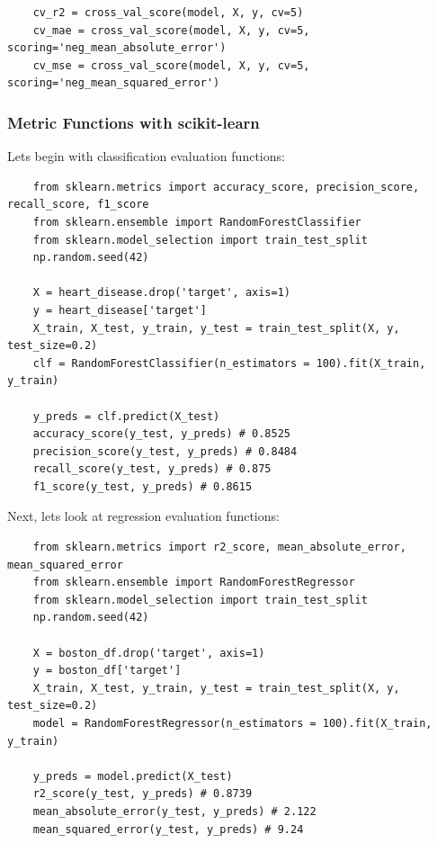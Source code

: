 \documentclass[11pt, a4paper]{article}
\begin{document}
\begin{spacing}{1.1}
\begin{lstlisting}
	cv_r2 = cross_val_score(model, X, y, cv=5) 
	cv_mae = cross_val_score(model, X, y, cv=5, scoring='neg_mean_absolute_error') 
	cv_mse = cross_val_score(model, X, y, cv=5, scoring='neg_mean_squared_error') \end{lstlisting} \vspace*{1mm}
	\subsubsection{Metric Functions with scikit-learn}
	Lets begin with classification evaluation functions:
	\begin{lstlisting}
	from sklearn.metrics import accuracy_score, precision_score, recall_score, f1_score
	from sklearn.ensemble import RandomForestClassifier
	from sklearn.model_selection import train_test_split
	np.random.seed(42)
	
	X = heart_disease.drop('target', axis=1)
	y = heart_disease['target']
	X_train, X_test, y_train, y_test = train_test_split(X, y, test_size=0.2)
	clf = RandomForestClassifier(n_estimators = 100).fit(X_train, y_train)
	
	y_preds = clf.predict(X_test)
	accuracy_score(y_test, y_preds) # 0.8525
	precision_score(y_test, y_preds) # 0.8484
	recall_score(y_test, y_preds) # 0.875
	f1_score(y_test, y_preds) # 0.8615	\end{lstlisting} \vspace*{1mm}
	Next, lets look at regression evaluation functions:
	\begin{lstlisting}
	from sklearn.metrics import r2_score, mean_absolute_error, mean_squared_error
	from sklearn.ensemble import RandomForestRegressor
	from sklearn.model_selection import train_test_split
	np.random.seed(42)
	
	X = boston_df.drop('target', axis=1)
	y = boston_df['target']
	X_train, X_test, y_train, y_test = train_test_split(X, y, test_size=0.2)
	model = RandomForestRegressor(n_estimators = 100).fit(X_train, y_train)
	
	y_preds = model.predict(X_test)
	r2_score(y_test, y_preds) # 0.8739
	mean_absolute_error(y_test, y_preds) # 2.122
	mean_squared_error(y_test, y_preds) # 9.24 \end{lstlisting} \newpage


\end{spacing}
\end{document}
